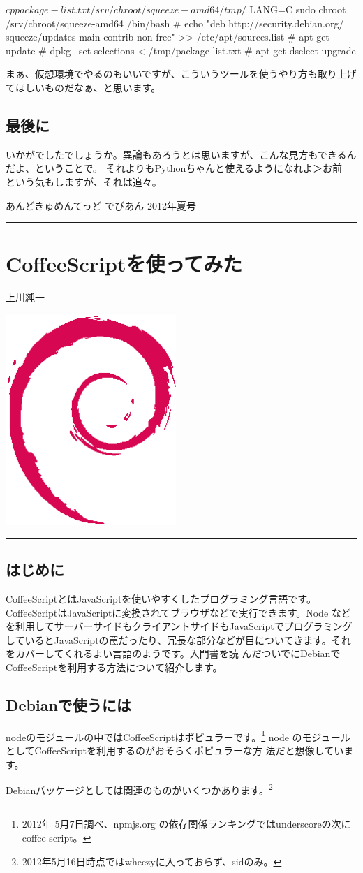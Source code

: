 \documentclass[mingoth,a4paper]{jsarticle}
\renewcommand{\dancersection}[2]{%
\newpage
あんどきゅめんてっど でびあん 2012年夏号
%
\vspace{0.1mm}\\
{\color{dancerdarkblue}\rule{\hsize}{2mm}}

%
%
\begin{minipage}[t]{0.6\hsize}
\color{dancerdarkblue}
\vspace{1cm}
\section{#1}
\hfill{}#2\\
\end{minipage}
\begin{minipage}[t]{0.4\hsize}
\vspace{-2cm}
\hfill{}\includegraphics[height=8cm]{image200502/openlogo-nd.eps}\\
\vspace{-5cm}
\end{minipage}
%
{\color{dancerlightblue}\rule{0.66\hsize}{2mm}}
%
\vspace{2cm}
}
\begin{document}
\begin{commandline}
$ cp package-list.txt /srv/chroot/squeeze-amd64/tmp/
$ LANG=C sudo chroot /srv/chroot/squeeze-amd64 /bin/bash
# echo "deb http://security.debian.org/ squeeze/updates main contrib non-free" >> /etc/apt/sources.list
# apt-get update
# dpkg --set-selections < /tmp/package-list.txt
# apt-get dselect-upgrade
\end{commandline}

まぁ、仮想環境でやるのもいいですが、こういうツールを使うやり方も取り上げてほしいものだなぁ、と思います。

\subsection{最後に}

いかがでしたでしょうか。異論もあろうとは思いますが、こんな見方もできるんだよ、ということで。
それよりもPythonちゃんと使えるようになれよ＞お前　という気もしますが、それは追々。

\clearpage

\dancersection{CoffeeScriptを使ってみた}{上川純一}

\subsection{はじめに}

CoffeeScriptとはJavaScriptを使いやすくしたプログラミング言語です。
CoffeeScriptはJavaScriptに変換されてブラウザなどで実行できます。Node など
を利用してサーバーサイドもクライアントサイドもJavaScriptでプログラミング
しているとJavaScriptの罠だったり、冗長な部分などが目についてきます。それ
をカバーしてくれるよい言語のようです。入門書\cite{smoothcoffeescript}を読
んだついでにDebianでCoffeeScriptを利用する方法について紹介します。

\subsection{Debianで使うには}

nodeのモジュールの中ではCoffeeScriptはポピュラーです。\footnote{2012年
5月7日調べ、npmjs.org の依存関係ランキングではunderscoreの次にcoffee-script。}
node のモジュールとしてCoffeeScriptを利用するのがおそらくポピュラーな方
法だと想像しています。

Debianパッケージとしては関連のものがいくつかあります。\footnote{2012年5月16日時点ではwheezyに入っておらず、sidのみ。}
\end{document}
